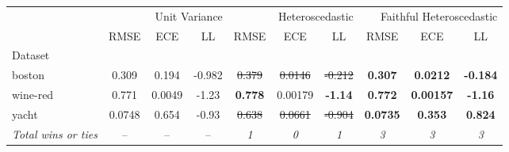 \begin{tabular}{l|ccc|ccc|ccc}
\toprule
{} & \multicolumn{3}{r}{Unit Variance} & \multicolumn{3}{r}{Heteroscedastic} & \multicolumn{3}{r}{Faithful Heteroscedastic} \\
{} & {RMSE} & {ECE} & {LL} & {RMSE} & {ECE} & {LL} & {RMSE} & {ECE} & {LL} \\
{Dataset} & {} & {} & {} & {} & {} & {} & {} & {} & {} \\
\midrule
boston & 0.309 & 0.194 & -0.982 & \sout{0.379} & \sout{0.0146} & \sout{-0.212} & \textbf{0.307} & \textbf{0.0212} & \textbf{-0.184} \\
wine-red & 0.771 & 0.0049 & -1.23 & \textbf{0.778} & 0.00179 & \textbf{-1.14} & \textbf{0.772} & \textbf{0.00157} & \textbf{-1.16} \\
yacht & 0.0748 & 0.654 & -0.93 & \sout{0.638} & \sout{0.0661} & \sout{-0.904} & \textbf{0.0735} & \textbf{0.353} & \textbf{0.824} \\
\textit{{Total wins or ties}} & -- & -- & -- & \textit{1} & \textit{0} & \textit{1} & \textit{3} & \textit{3} & \textit{3} \\
\bottomrule
\end{tabular}
